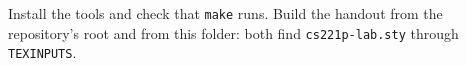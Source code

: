 \documentclass{article}
\begin{document}
 Install the tools and check that \texttt{make} runs.
 Build the handout from the repository's root and from this
folder: both find \texttt{cs221p-lab.sty} through \texttt{TEXINPUTS}.
\end{document}
